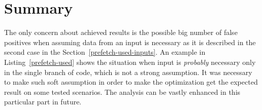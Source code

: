 \section{Summary}
The only concern about achieved results is the possible big number of false positives when assuming data from an input is necessary as it is described in the second case in the Section~\ref{prefetch-used-inputs}. An example in Listing~\ref{prefetch-used} shows the situation when input is \emph{probably} necessary only in the single branch of code, which is not a strong assumption. It was necessary to make such soft assumption in order to make the optimization get the expected result on some tested scenarios. The analysis can be vastly enhanced in this particular part in future.